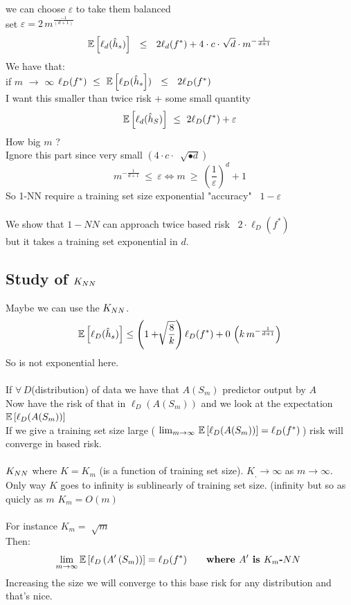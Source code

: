 \documentclass[../main.tex]{subfiles}
\begin{document}
we can choose $\varepsilon$ to take them balanced
\\set $\varepsilon = 2 \, m^{\frac{-1}{(d+1)}} $
\\
$$
\mathbb{E} 
\left[ 
\ell_d (\hat{h}_s)  \right] \ \
\leq \ \
2 
\ell_d (f^*)
 + 
 4 \cdot c \cdot \ \sqrt[]{d} 
 \cdot m^{- \frac{1}{d+1}}
$$
We have that:\\
if $m$ $\longrightarrow$ $\infty$ \quad 
$\ell_D (f^*) \
 \leq  \
\mathbb{E} \left[ \ell_D (\hat{h}_s \right] ) \ \
\leq  \ \
2 \ell_D(f^*)$
\\
I want this smaller than twice risk + some small quantity
$$
\barra{E} \left[ \ell_d(\hat{h}_S) \right] \ \leq  \ 2 \ell_D(f^*) + \varepsilon
$$
How big $m$ ?\\
Ignore this part since very small $(4 \cdot c \cdot \ \sqrt[]{•d})$
\\
$$
m ^ {-\frac{1}{d+1}} \ \leq \ \varepsilon \Leftrightarrow m \ \geq  \ \left(\frac{1}{\varepsilon}\right)^d+1 
$$
So 1-NN require a training set size exponential "accuracy" \ $1-\varepsilon$
\\\\
We show that $1-NN$ can approach twice based risk \ $2 \cdot \ell_D(f^*)$\\
but it takes a training set exponential in $d$.
\\
\subsection{Study of $K_{NN}$}
Maybe we can use the $K_{NN}$.
$$
\mathbb{E}\left[ \ell_D(\hat{h}_s)\right] \leq \left( 1+ \sqrt[]{\frac{8}{k}}\right) \ell_D(f^*) + 0 \, \left(k \, m^{-\frac{1}{d+1}}\right)
$$
So is not exponential here.
\\
\\
If $\forall \, D$(distribution) of data we have that $A(S_m)$ predictor output by $A$\\
Now have the risk of that in $\ell_D(A(S_m))$ and we look at the expectation  $\mathbb{E}\left[\ell_D(A(S_m))\right]$
\\If we give a training set size large ($ \ \lim_{m \rightarrow \infty} \, \barra{E}\left[\ell_D(A(S_m))\right] = \ell_D (f^*)\, $) risk will converge in based risk.
\\\\
$K_{NN}$ where $K = K_m$ (is a function of training set size).
$K_, \rightarrow \infty $ as $m \rightarrow \infty$.
\\
Only way $K$ goes to infinity is sublinearly of training set size. (infinity but so as quicly as $m$
$K_m = O(m)$
\\\\
For instance $K_m = \sqrt[]{m}$
\\
Then: 
$$
\lim_{m \rightarrow \infty} \mathbb{E} \left[ \ell_D\left(A'\left(S_m\right)\right) \right] = \ell_D(f^*) \qquad \textbf{where $A'$ is $K_m$-$NN$ } 
$$
Increasing the size we will converge to this base risk for any distribution and that's nice.
\\\\
\end{document}

